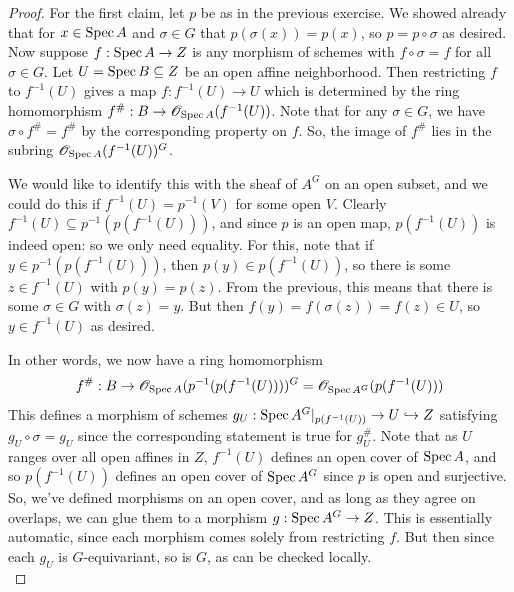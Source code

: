 \begin{proof}
	For the first claim, let $p$ be as in the previous exercise. We showed already that for $x \in \operatorname{Spec} A$ and $\sigma \in G$ that $p(\sigma(x)) = p(x)$, so $p = p \circ \sigma$ as desired. Now suppose $f : \operatorname{Spec} A \to Z$ is any morphism of schemes with $f \circ \sigma = f$ for all $\sigma \in G$. Let $U = \operatorname{Spec} B \subseteq Z$ be an open affine neighborhood. Then restricting $f$ to $f^{-1}(U)$ gives a map $f : f^{-1}(U) \to U$ which is determined by the ring homomorphism $f^\# : B \to \mathscr{O}_{\operatorname{Spec} A}(f^{-1}(U))$. Note that for any $\sigma \in G$, we have $\sigma \circ f^\# = f^\#$ by the corresponding property on $f$. So, the image of $f^\#$ lies in the subring $\mathscr{O}_{\operatorname{Spec} A}(f^{-1}(U))^G$.
	
	We would like to identify this with the sheaf of $A^G$ on an open subset, and we could do this if $f^{-1}(U) = p^{-1}(V)$ for some open $V$. Clearly $f^{-1}(U) \subseteq p^{-1}(p(f^{-1}(U)))$, and since $p$ is an open map, $p(f^{-1}(U))$ is indeed open: so we only need equality. For this, note that if $y \in p^{-1}(p(f^{-1}(U)))$, then $p(y) \in p(f^{-1}(U))$, so there is some $z \in f^{-1}(U)$ with $p(y) = p(z)$. From the previous, this means that there is some $\sigma \in G$ with $\sigma(z) = y$. But then $f(y) = f(\sigma(z)) = f(z) \in U$, so $y \in f^{-1}(U)$ as desired.
	
	In other words, we now have a ring homomorphism
	\[ f^\# : B \to \mathscr{O}_{\operatorname{Spec} A}(p^{-1}(p(f^{-1}(U))))^G = \mathscr{O}_{\operatorname{Spec} A^G}(p(f^{-1}(U))) \]
	This defines a morphism of schemes $g_U : \operatorname{Spec} A^G|_{p(f^{-1}(U))} \to U \hookrightarrow Z$ satisfying $g_U \circ \sigma = g_U$ since the corresponding statement is true for $g_U^\#$. Note that as $U$ ranges over all open affines in $Z$, $f^{-1}(U)$ defines an open cover of $\operatorname{Spec} A$, and so $p(f^{-1}(U))$ defines an open cover of $\operatorname{Spec} A^G$ since $p$ is open and surjective. So, we've defined morphisms on an open cover, and as long as they agree on overlaps, we can glue them to a morphism $g : \operatorname{Spec} A^G \to Z$. This is essentially automatic, since each morphism comes solely from restricting $f$. But then since each $g_U$ is $G$-equivariant, so is $G$, as can be checked locally. \\
	
	
\end{proof}
